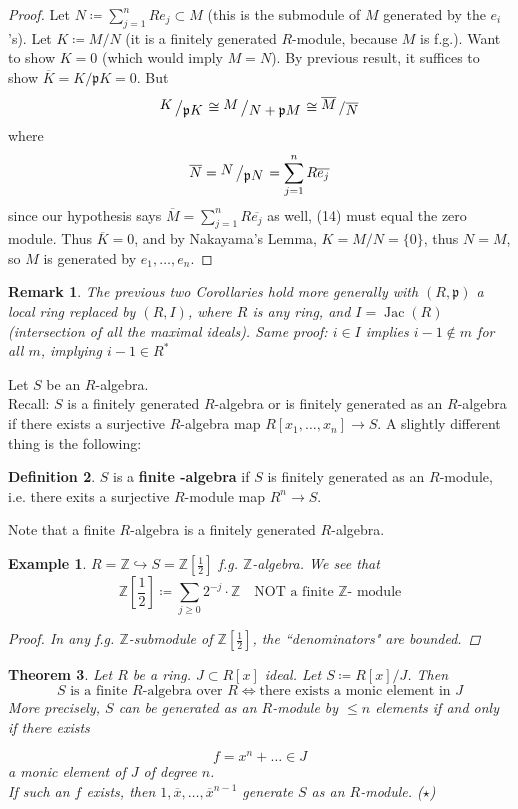 \documentclass[12pt]{article}
\newcommand{\z}{\mathbb{Z}}
\DeclareMathOperator{\Jac}{Jac}
\newcommand{\bigslant}[2]{{\raisebox{.2em}{$#1$}\left/\raisebox{-.2em}{$#2$}\right.}}
\def\p{\mathfrak{p}}
\newtheorem{theorem}{Theorem}
\newtheorem{remark}[theorem]{Remark}
\newtheorem*{eg}{Example}
\theoremstyle{definition}
\newtheorem{definition}[theorem]{Definition}
\begin{document}
\begin{proof}
Let $N \coloneqq \sum_{j=1}^n Re_j \subset M$ (this is the submodule of $M$ generated by the $e_i$'s). Let $K\coloneqq M/N$ (it is a finitely generated $R$-module, because $M$ is f.g.). Want to show $K = 0$ (which would imply $M=N$). By previous result, it suffices to show $\overline{K} = K/\p K = 0$. But
\begin{equation}
\bigslant{K}{\p K} \cong \bigslant{M}{N+\p M} \cong \bigslant{\overline{M}}{\overline{N}}  
\end{equation}
where
\[
\overline{N} = \bigslant{N}{\p N} = \sum_{j=1}^n R \overline{e_j}
\]
since our hypothesis says $\overline{M} = \sum_{j=1}^n R \overline{e_j}$ as well, (14) must equal the zero module. Thus $\overline{K} = 0$, and by Nakayama's Lemma, $K = M/N =\{0\}$, thus $N=M$, so $M$ is generated by $e_1,\dots, e_n$.
\end{proof}
\begin{remark}
The previous two Corollaries hold more generally with $(R,\p)$ a local ring replaced by $(R,I)$, where $R$ is any ring, and $I = \Jac(R)$ (intersection of all the maximal ideals). Same proof: $i\in I$ implies $i-1 \notin m$ for all $m$, implying $i-1\in R^\ast$
\end{remark}
Let $S$ be an $R$-algebra. \\
Recall: $S$ is a finitely generated $R$-algebra or is finitely generated as an $R$-algebra if there exists a surjective $R$-algebra map $R[x_1,\dots, x_n] \rightarrow S$. A slightly different thing is the following:
\begin{definition}
$S$ is a \textbf{finite -algebra} if $S$ is finitely generated as an $R$-module, i.e. there exits a surjective $R$-module map $R^n \rightarrow S$. 
\end{definition}
Note that a finite $R$-algebra is a finitely generated $R$-algebra.
\begin{eg}
$R=\z \hookrightarrow S = \z\left[\frac{1}{2}\right]$ f.g. $\z$-algebra. We see that 
\[
\z\left[\frac{1}{2}\right] \coloneqq \sum_{j\geq 0} 2^{-j}\cdot \z \quad \text{NOT a finite }\z\text{- module}
\]
\begin{proof}
In any f.g. $\z$-submodule of $\z[\frac{1}{2}]$, the ``denominators" are bounded.
\end{proof}
\end{eg}
\begin{theorem}
Let $R$ be a ring. $J \subset R[x]$ ideal. Let $S \coloneqq R[x]/J$. Then
\[
S \text{ is a finite $R$-algebra over }R \iff \text{there exists a monic element in }J
\]
More precisely, $S$ can be generated as an $R$-module by $\leq n$ elements if and only if there exists

\[
f = x^n+\dots \in J
\]
a monic element of $J$ of degree $n$.\\
If such an $f$ exists, then $1,\overline{x}, \dots, \overline{x}^{n-1}$ generate $S$ as an $R$-module. ($\star$)
\end{theorem}
\end{document}
